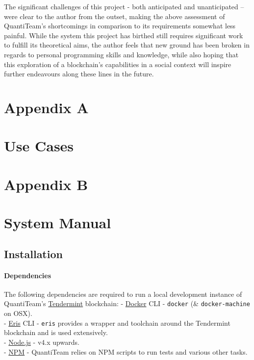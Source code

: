 \documentclass[12pt]{report}
\let\oldparagraph\paragraph
\renewcommand{\paragraph}[1]{\oldparagraph{#1}\mbox{}}
\begin{document}
The significant challenges of this project - both anticipated and
unanticipated -- were clear to the author from the outset, making the
above assessment of QuantiTeam's shortcomings in comparison to its
requirements somewhat less painful. While the system this project has
birthed still requires significant work to fulfill its theoretical aims,
the author feels that new ground has been broken in regards to personal
programming skills and knowledge, while also hoping that this
exploration of a blockchain's capabilities in a social context will
inspire further endeavours along these lines in the future.

\printbibliography

\section{Appendix A}\label{appendix-a}

\section{Use Cases}\label{use-cases-1}

\section{Appendix B}\label{appendix-b}

\section{System Manual}\label{system-manual}

\subsection{Installation}\label{installation}

\paragraph{Dependencies}\label{dependencies}

The following dependencies are required to run a local development
instance of QuantiTeam's
\href{https://github.com/tendermint/tendermint}{Tendermint} blockchain:
- \href{https://www.docker.com/}{Docker} CLI - \texttt{docker} (\&
\texttt{docker-machine} on OSX).\\
- \href{https://erisindustries.com/}{Eris} CLI - \texttt{eris} provides
a wrapper and toolchain around the Tendermint blockchain and is used
extensively.\\
- \href{https://nodejs.org/en/}{Node.js} - v4.x upwards.\\
- \href{https://www.npmjs.com/}{NPM} - QuantiTeam relies on NPM scripts
to run tests and various other tasks.
\end{document}
